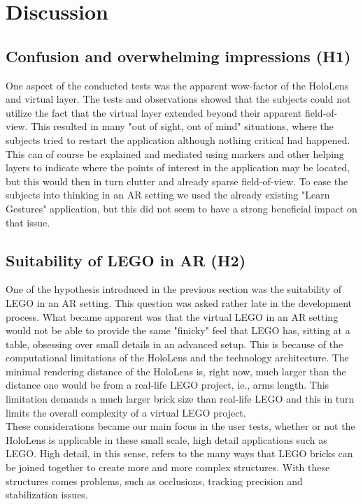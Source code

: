 
\section{Discussion}

\subsection{Confusion and overwhelming impressions (H1)}
One aspect of the conducted tests was the apparent wow-factor of the HoloLens and virtual layer. The tests and observations showed that the subjects could not utilize the fact that the virtual layer extended beyond their apparent field-of-view. This resulted in many "out of sight, out of mind" situations, where the subjects tried to restart the application although nothing critical had happened. This can of course be explained and mediated using markers and other helping layers to indicate where the points of interest in the application may be located, but this would then in turn clutter and already sparse field-of-view. To ease the subjects into thinking in an AR setting we used the already existing "Learn Gestures" application, but this did not seem to have a strong beneficial impact on that issue. 

\subsection{Suitability of LEGO in AR (H2)}
One of the hypothesis introduced in the previous section was the suitability of LEGO in an AR setting. This question was asked rather late in the development process. What became apparent was that the virtual LEGO in an AR setting would not be able to provide the same "finicky" feel that LEGO has, sitting at a table, obsessing over small details in an advanced setup. This is because of the computational limitations of the HoloLens and the technology architecture. The minimal rendering distance of the HoloLens is, right now, much larger than the distance one would be from a real-life LEGO project, ie., arms length. This limitation demands a much larger brick size than real-life LEGO and this in turn limits the overall complexity of a virtual LEGO project. \\
These considerations became our main focus in the user tests, whether or not the HoloLens is applicable in these small scale, high detail applications such as LEGO. High detail, in this sense, refers to the many ways that LEGO bricks can be joined together to create more and more complex structures. With these structures comes problems, such as occlusions, tracking precision and stabilization issues. 